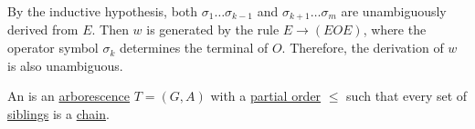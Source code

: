 \begin{example}
\begin{itemize}
    By the inductive hypothesis, both \( \sigma_1 \ldots \sigma_{k-1} \) and \( \sigma_{k+1} \ldots \sigma_m \) are unambiguously derived from \( E \). Then \( w \) is generated by the rule \( E \to (E O E) \), where the operator symbol \( \sigma_k \) determines the terminal of \( O \). Therefore, the derivation of \( w \) is also unambiguous.
  \end{itemize}
\end{example}

\begin{definition}\label{def:ordered_arborescence}
  An  is an \hyperref[def:arborescence]{arborescence} \( T = (G, A) \) with a \hyperref[def:partially_ordered_set]{partial order} \( \leq \) such that every set of \hyperref[def:arborescence/ancestry]{siblings} is a \hyperref[def:partially_ordered_set_chain_and_antichain]{chain}.
\end{definition}

